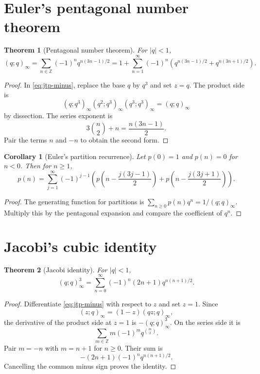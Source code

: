 \documentclass[11pt,oneside,openany]{book}
\newtheorem{theorem}{Theorem}[chapter]
\newtheorem{corollary}[corollary]{Corollary}
\theoremstyle{definition}
\theoremstyle{remark}
\newcommand{\Z}{\mathbb Z}
\newcommand{\abs}[1]{\lvert #1\rvert}
\begin{document}
\section{Euler's pentagonal number theorem}

\begin{theorem}[Pentagonal number theorem]\label{thm:pentagonal}
For $\abs q<1$,
\[
 (q;q)_\infty
 =\sum_{n\in\Z}(-1)^nq^{n(3n-1)/2}
 =1+\sum_{n=1}^{\infty}(-1)^n
 \left(q^{n(3n-1)/2}+q^{n(3n+1)/2}\right).
\]
\end{theorem}

\begin{proof}
In \eqref{eq:jtp-minus}, replace the base $q$ by $q^3$ and set $z=q$.  The product side is
\[
 (q;q^3)_\infty(q^2;q^3)_\infty(q^3;q^3)_\infty=(q;q)_\infty
\]
by dissection.  The series exponent is
\[
 3\binom n2+n=\frac{n(3n-1)}2.
\]
Pair the terms $n$ and $-n$ to obtain the second form.
\end{proof}

\begin{corollary}[Euler's partition recurrence]\label{cor:euler-partition-recurrence}
Let $p(0)=1$ and $p(n)=0$ for $n<0$.  Then for $n\ge1$,
\[
 p(n)=\sum_{j=1}^{\infty}(-1)^{j-1}
 \left(p\!\left(n-\frac{j(3j-1)}2\right)
 +p\!\left(n-\frac{j(3j+1)}2\right)\right).
\]
\end{corollary}

\begin{proof}
The generating function for partitions is
\(
 \sum_{n\ge0}p(n)q^n=1/(q;q)_\infty.
\)
Multiply this by the pentagonal expansion and compare the coefficient of $q^n$.
\end{proof}

\section{Jacobi's cubic identity}

\begin{theorem}[Jacobi identity]\label{thm:jacobi-cubic}
For $\abs q<1$,
\[
 (q;q)_\infty^3
 =\sum_{n=0}^{\infty}(-1)^n(2n+1)q^{n(n+1)/2}.
\]
\end{theorem}

\begin{proof}
Differentiate \eqref{eq:jtp-minus} with respect to $z$ and set $z=1$.  Since
\[
 (z;q)_\infty=(1-z)(qz;q)_\infty,
\]
the derivative of the product side at $z=1$ is $-(q;q)_\infty^3$.  On the series side it is
\[
 \sum_{m\in\Z}m(-1)^mq^{\binom m2}.
\]
Pair $m=-n$ with $m=n+1$ for $n\ge0$.  Their sum is
\[
 -(2n+1)(-1)^nq^{n(n+1)/2}.
\]
Cancelling the common minus sign proves the identity.
\end{proof}
\end{document}
